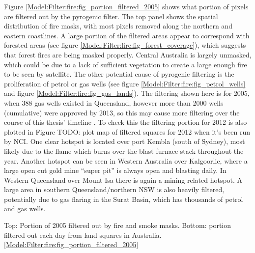     Figure \ref{Model:Filter:fire:fig_portion_filtered_2005} shows what portion of pixels are filtered out by the pyrogenic filter. 
    The top panel shows the spatial distribution of fire masks, with most pixels removed along the northern and eastern coastlines.
    A large portion of the filtered areas appear to correspond with forested areas (see figure \ref{Model:Filter:fire:fig_forest_coverage}), which suggests that forest fires are being masked properly.
    Central Australia is largely unmasked, which could be due to a lack of sufficient vegetation to create a large enough fire to be seen by satellite.
    The other potential cause of pyrogenic filtering is the proliferation of petrol or gas wells (see figure \ref{Model:Filter:fire:fig_petrol_wells} and figure \ref{Model:Filter:fire:fig_gas_lands}).
    The filtering shown here is for 2005, when 388 gas wells existed in Queensland, however more than 2000 wells (cumulative) were approved by 2013, so this may cause more filtering over the course of this thesis' timeline \parencite{Carlisle2012}.
    To check this the filtering portion for 2012 is also plotted in Figure TODO: plot map of filtered squares for 2012 when it's been run by NCI.
    One clear hotspot is located over port Kembla (south of Sydney), most likely due to the flame which burns over the blast furnace stack throughout the year.
    Another hotspot can be seen in Western Australia over Kalgoorlie, where a large open cut gold mine ``super pit'' is always open and blasting daily.
    In Western Queensland over Mount Isa there is again a mining related hotspot.
    A large area in southern Queensland/northern NSW is also heavily filtered, potentially due to gas flaring in the Surat Basin, which has thousands of petrol and gas wells.
    
    
    {Top: Portion of 2005 filtered out by fire and smoke masks. Bottom: portion filtered out each day from land squares in Australia.}{\ref{Model:Filter:fire:fig_portion_filtered_2005}}
    
    
    
